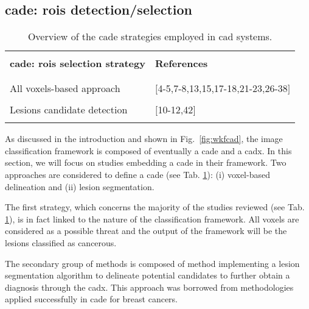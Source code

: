 \subsection{\ac{cade}: \acp{roi} detection/selection}

\begin{table}
	\caption{Overview of the \ac{cade} strategies employed in \ac{cad} systems.}
	\small
	\begin{tabular}{p{.65\linewidth} p{.25\linewidth}}
		\hline \\ [-1.5ex]
		\textbf{\ac{cade}: \acp{roi} selection strategy} & \textbf{References} \\ \\ [-1.5ex]
		\hline \\ [-1.5ex]
		\quad All voxels-based approach & $[$4-5,7-8,13,15,17-18,21-23,26-38$]$ \\ \\ [-1.5ex]
		\quad Lesions candidate detection & $[$10-12,42$]$ \\ \\ [-1.5ex]
		\hline
	\end{tabular}
	\label{tab:cade}
\end{table}

As discussed in the introduction and shown in Fig.~\ref{fig:wkfcad}, the image classification framework is composed of eventually a \ac{cade} and a \ac{cadx}. In this section, we will focus on studies embedding a \ac{cade} in their framework. Two approaches are considered to define a \ac{cade} (see Tab. \ref{tab:cade}): (i) voxel-based delineation and (ii) lesion segmentation.

The first strategy, which concerns the majority of the studies reviewed (see Tab. \ref{tab:cade}), is in fact linked to the nature of the classification framework. All voxels are considered as a possible threat and the output of the framework will be the lesions classified as cancerous.

The secondary group of methods is composed of method implementing a lesion segmentation algorithm to delineate potential candidates to further obtain a diagnosis through the \ac{cadx}. This approach was borrowed from methodologies applied successfully in \ac{cade} for breast cancers.

